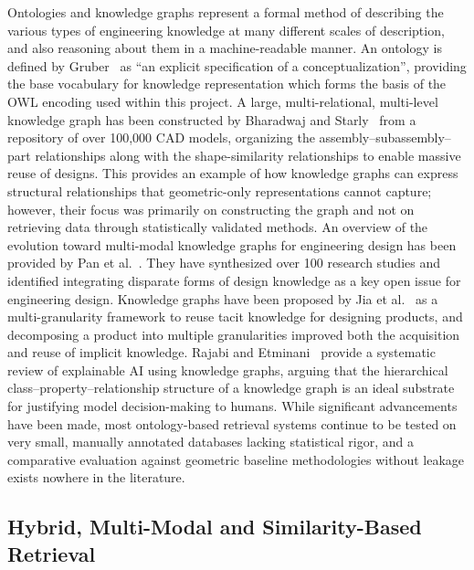 \documentclass[preprint,12pt]{elsarticle}
\begin{document}
Ontologies and knowledge graphs represent a formal method of describing the various types of engineering knowledge at many different scales of description, and also reasoning about them in a machine-readable manner.
An ontology is defined by Gruber~\cite{Gruber1993} as ``an explicit specification of a conceptualization'', providing the base vocabulary for knowledge representation which forms the basis of the OWL encoding used within this project.
A large, multi-relational, multi-level knowledge graph has been constructed by Bharadwaj and Starly~\cite{Bharadwaj2022} from a repository of over 100{,}000 CAD models, organizing the assembly--subassembly--part relationships along with the shape-similarity relationships to enable massive reuse of designs.
This provides an example of how knowledge graphs can express structural relationships that geometric-only representations cannot capture; however, their focus was primarily on constructing the graph and not on retrieving data through statistically validated methods.
An overview of the evolution toward multi-modal knowledge graphs for engineering design has been provided by Pan et al.~\cite{Pan2024}.
They have synthesized over 100 research studies and identified integrating disparate forms of design knowledge as a key open issue for engineering design.
Knowledge graphs have been proposed by Jia et al.~\cite{Jia2025} as a multi-granularity framework to reuse tacit knowledge for designing products, and decomposing a product into multiple granularities improved both the acquisition and reuse of implicit knowledge.
Rajabi and Etminani~\cite{Rajabi2024} provide a systematic review of explainable AI using knowledge graphs, arguing that the hierarchical class--property--relationship structure of a knowledge graph is an ideal substrate for justifying model decision-making to humans.
While significant advancements have been made, most ontology-based retrieval systems continue to be tested on very small, manually annotated databases lacking statistical rigor, and a comparative evaluation against geometric baseline methodologies without leakage exists nowhere in the literature.

\subsection{Hybrid, Multi-Modal and Similarity-Based Retrieval}
\end{document}

